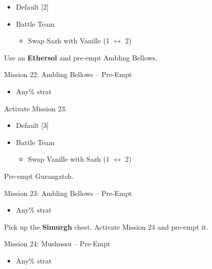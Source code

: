 \begin{menu}
	\begin{itemize}
		\paradigm
		\begin{itemize}
			\item Default [2]
			\item Battle Team
				\begin{itemize}
					\item Swap Sazh with Vanille (1 $\leftrightarrow$ 2)
				\end{itemize}						      			      	
		\end{itemize}
	\end{itemize}
\end{menu}

Use an \textbf{Ethersol} and pre-empt Ambling Bellows.

\begin{battle}{Mission 22: Ambling Bellows -- Pre-Empt}
	\begin{itemize}
		\item Any\% strat
	\end{itemize}
\end{battle}

Activate Mission 23.

\begin{menu}
	\begin{itemize}
		\paradigm
		\begin{itemize}
			\item Default [3]
			\item Battle Team
				\begin{itemize}
					\item Swap Vanille with Sazh (1 $\leftrightarrow$ 2)
				\end{itemize}						      			      	
		\end{itemize}
	\end{itemize}
\end{menu}

Pre-empt Gurangatch.

\begin{battle}{Mission 23: Ambling Bellows -- Pre-Empt}
	\begin{itemize}
		\item Any\% strat
	\end{itemize}
\end{battle}

Pick up the \textbf{Simurgh} chest.
Activate Mission 24 and pre-empt it.

\begin{battle}{Mission 24: Mushussu -- Pre-Empt}
	\begin{itemize}
		\item Any\% strat
	\end{itemize}
\end{battle}

